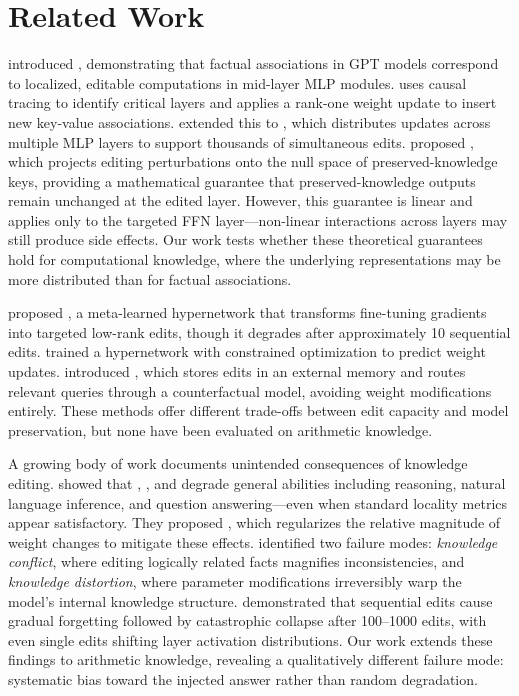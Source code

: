 \section{Related Work}
\label{sec:related}

\citet{meng2022rome} introduced \rome, demonstrating that factual associations in GPT models correspond to localized, editable computations in mid-layer MLP modules.
\rome uses causal tracing to identify critical layers and applies a rank-one weight update to insert new key-value associations.
\citet{meng2023memit} extended this to \memit, which distributes updates across multiple MLP layers to support thousands of simultaneous edits.
\citet{fang2025alphaedit} proposed \alphaedit, which projects editing perturbations onto the null space of preserved-knowledge keys, providing a mathematical guarantee that preserved-knowledge outputs remain unchanged at the edited layer.
However, this guarantee is linear and applies only to the targeted FFN layer---non-linear interactions across layers may still produce side effects.
Our work tests whether these theoretical guarantees hold for computational knowledge, where the underlying representations may be more distributed than for factual associations.

\citet{mitchell2022mend} proposed \mend, a meta-learned hypernetwork that transforms fine-tuning gradients into targeted low-rank edits, though it degrades after approximately 10 sequential edits.
\citet{decao2021knowledgeeditor} trained a hypernetwork with constrained optimization to predict weight updates.
\citet{mitchell2022serac} introduced \serac, which stores edits in an external memory and routes relevant queries through a counterfactual model, avoiding weight modifications entirely.
These methods offer different trade-offs between edit capacity and model preservation, but none have been evaluated on arithmetic knowledge.

A growing body of work documents unintended consequences of knowledge editing.
\citet{gu2024editing} showed that \rome, \memit, and \mend degrade general abilities including reasoning, natural language inference, and question answering---even when standard locality metrics appear satisfactory.
They proposed \rect, which regularizes the relative magnitude of weight changes to mitigate these effects.
\citet{li2024pitfalls} identified two failure modes: \emph{knowledge conflict}, where editing logically related facts magnifies inconsistencies, and \emph{knowledge distortion}, where parameter modifications irreversibly warp the model's internal knowledge structure.
\citet{gupta2024editing} demonstrated that sequential edits cause gradual forgetting followed by catastrophic collapse after 100--1000 edits, with even single edits shifting layer activation distributions.
Our work extends these findings to arithmetic knowledge, revealing a qualitatively different failure mode: systematic bias toward the injected answer rather than random degradation.

